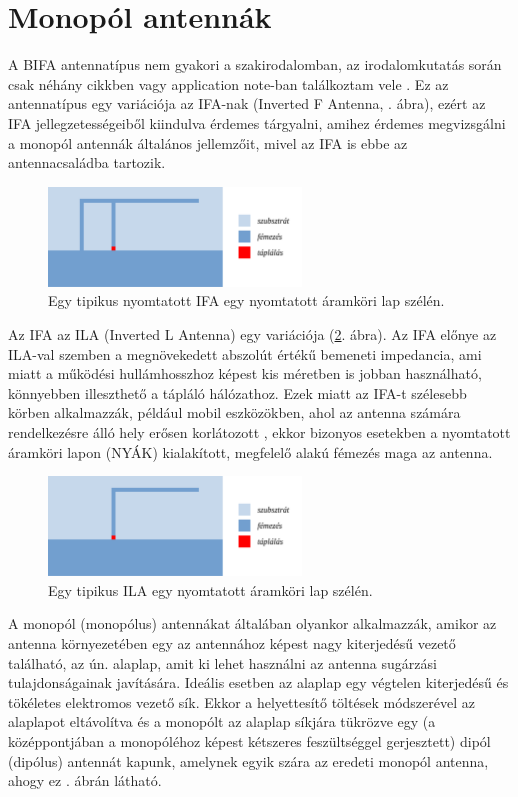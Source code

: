 \section{Monopól antennák}
\par A BIFA antennatípus nem gyakori a szakirodalomban, az irodalomkutatás során csak néhány cikkben vagy application note-ban találkoztam vele \cite{an847, bifa-be, bifa-ma, bifa-ca}. Ez az antennatípus egy variációja az IFA-nak (Inverted F Antenna, . ábra), ezért az IFA jellegzetességeiből kiindulva érdemes tárgyalni, amihez érdemes megvizsgálni a monopól antennák általános jellemzőit, mivel az IFA is ebbe az antennacsaládba tartozik.
\begin{figure}[h]
	\centering
	\includegraphics[width=0.6\textwidth]{kep/tipikus_ifa.pdf}
	\caption{Egy tipikus nyomtatott IFA egy nyomtatott áramköri lap szélén.}
	\label{fig:tipikus_ifa}
\end{figure}
\par Az IFA az ILA (Inverted L Antenna) egy variációja (\ref{fig:tipikus_ila}. ábra). Az IFA előnye az ILA-val szemben a megnövekedett abszolút értékű bemeneti impedancia, ami miatt a működési hullámhosszhoz képest kis méretben is jobban használható, könnyebben illeszthető a tápláló hálózathoz. Ezek miatt az IFA-t szélesebb körben alkalmazzák, például mobil eszközökben, ahol az antenna számára rendelkezésre álló hely erősen korlátozott \cite{multi-band}, ekkor bizonyos esetekben a nyomtatott áramköri lapon (NYÁK) kialakított, megfelelő alakú fémezés maga az antenna.
\begin{figure}[h]
	\centering
	\includegraphics[width=0.6\textwidth]{kep/tipikus_ila.pdf}
	\caption{Egy tipikus ILA egy nyomtatott áramköri lap szélén.}
	\label{fig:tipikus_ila}
\end{figure}
\par A monopól (monopólus) antennákat általában olyankor alkalmazzák, amikor az antenna környezetében egy az antennához képest nagy kiterjedésű vezető található, az ún. alaplap, amit ki lehet használni az antenna sugárzási tulajdonságainak javítására. Ideális esetben az alaplap egy végtelen kiterjedésű és tökéletes elektromos vezető sík. Ekkor a helyettesítő töltések módszerével \cite{fodor} az alaplapot eltávolítva és a monopólt az alaplap síkjára tükrözve egy (a középpontjában a monopóléhoz képest kétszeres feszültséggel gerjesztett) dipól (dipólus) antennát kapunk, amelynek egyik szára az eredeti monopól antenna, ahogy ez . ábrán látható.
